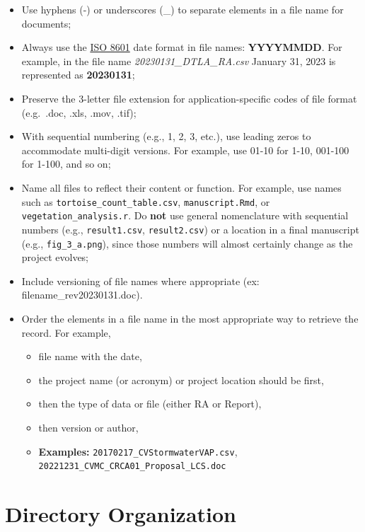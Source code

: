 \documentclass[
]{book}
\providecommand{\tightlist}{%
  \setlength{\itemsep}{0pt}\setlength{\parskip}{0pt}}
\begin{document}
\begin{itemize}
\item
  Use hyphens (-) or underscores (\_) to separate elements in a file name for documents;
\item
  Always use the \href{https://www.iso.org/iso-8601-date-and-time-format.html}{ISO 8601} date format in file names: \textbf{YYYYMMDD}. For example, in the file name \emph{20230131\_DTLA\_RA.csv} January 31, 2023 is represented as \textbf{20230131};
\item
  Preserve the 3-letter file extension for application-specific codes of file format (e.g.~.doc, .xls, .mov, .tif);
\item
  With sequential numbering (e.g., 1, 2, 3, etc.), use leading zeros to accommodate multi-digit versions. For example, use 01-10 for 1-10, 001-100 for 1-100, and so on;
\item
  Name all files to reflect their content or function. For example, use names such as \texttt{tortoise\_count\_table.csv}, \texttt{manuscript.Rmd}, or \texttt{vegetation\_analysis.r}. Do \textbf{not} use general nomenclature with sequential numbers (e.g., \texttt{result1.csv}, \texttt{result2.csv}) or a location in a final manuscript (e.g., \texttt{fig\_3\_a.png}), since those numbers will almost certainly change as the project evolves;
\item
  Include versioning of file names where appropriate (ex: filename\_rev20230131.doc).
\item
  Order the elements in a file name in the most appropriate way to retrieve the record. For example,

  \begin{itemize}
  \tightlist
  \item
    file name with the date,
  \item
    the project name (or acronym) or project location should be first,
  \item
    then the type of data or file (either RA or Report),
  \item
    then version or author,
  \item
    \textbf{Examples:} \texttt{20170217\_CVStormwaterVAP.csv}, \texttt{20221231\_CVMC\_CRCA01\_Proposal\_LCS.doc}
  \end{itemize}
\end{itemize}

\hypertarget{directory-organization}{%
\section{Directory Organization}\label{directory-organization}}
\end{document}
